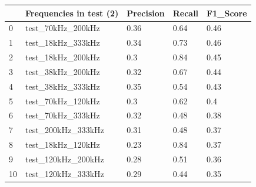 \begin{longtable}{lllll}
\hline
\multicolumn{1}{|l|}{} & \multicolumn{1}{l|}{Frequencies in test (2)} & \multicolumn{1}{l|}{Precision} & \multicolumn{1}{l|}{Recall} & \multicolumn{1}{l|}{F1\_Score} \\ \hline
\endfirsthead
%
\endhead
%
\hline
\endfoot
%
\endlastfoot
%
0                      & test\_70kHz\_200kHz                         & 0.36                           & 0.64                        & 0.46                           \\
1                      & test\_18kHz\_333kHz                         & 0.34                           & 0.73                        & 0.46                           \\
2                      & test\_18kHz\_200kHz                         & 0.3                            & 0.84                        & 0.45                           \\
3                      & test\_38kHz\_200kHz                         & 0.32                           & 0.67                        & 0.44                           \\
4                      & test\_38kHz\_333kHz                         & 0.35                           & 0.54                        & 0.43                           \\
5                      & test\_70kHz\_120kHz                         & 0.3                            & 0.62                        & 0.4                            \\
6                      & test\_70kHz\_333kHz                         & 0.32                           & 0.48                        & 0.38                           \\
7                      & test\_200kHz\_333kHz                        & 0.31                           & 0.48                        & 0.37                           \\
8                      & test\_18kHz\_120kHz                         & 0.23                           & 0.84                        & 0.37                           \\
9                      & test\_120kHz\_200kHz                        & 0.28                           & 0.51                        & 0.36                           \\
10                     & test\_120kHz\_333kHz                        & 0.29                           & 0.44                        & 0.35                           \\

\end{longtable}
